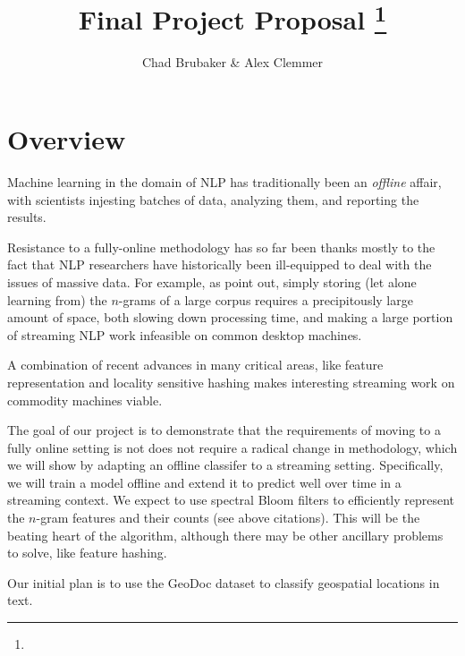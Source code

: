 \documentclass[11pt]{article}
\title{Final Project Proposal
\footnote{\s{CS 6955 Data Mining; \;\; Spring 2012 \hfill
Instructor: Jeff M. Phillips, University of Utah}
}
}
\author{Chad Brubaker \& Alex Clemmer}
\begin{document}
\maketitle





\section{Overview}

Machine learning in the domain of NLP has traditionally been an \textit{offline} affair, with scientists injesting batches of data, analyzing them, and reporting the results.

Resistance to a fully-online methodology has so far been thanks mostly to the fact that NLP researchers have historically been ill-equipped to deal with the issues of massive data. For example, as \cite{to2007} point out, simply storing (let alone learning from) the $n$-grams of a large corpus requires a precipitously large amount of space, both slowing down processing time, and making a large portion of streaming NLP work infeasible on common desktop machines.

A combination of recent advances in many critical areas, like feature representation \cite{vdl2011} and locality sensitive hashing \cite{vdl2009} makes interesting streaming work on commodity machines viable.

The goal of our project is to demonstrate that the requirements of moving to a fully online setting is not does not require a radical change in methodology, which we will show by adapting an offline classifer to a streaming setting. Specifically, we will train a model offline and extend it to predict well over time in a streaming context. We expect to use spectral Bloom filters to efficiently represent the $n$-gram features and their counts (see above citations). This will be the beating heart of the algorithm, although there may be other ancillary problems to solve, like feature hashing.

Our initial plan is to use the GeoDoc \cite{gd} dataset to classify geospatial locations in text.






\end{document}
